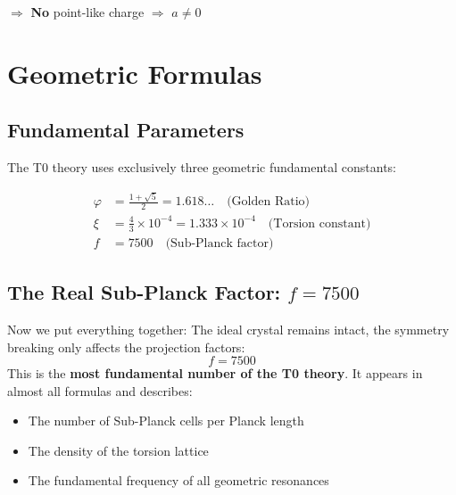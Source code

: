 	$\Rightarrow$ \textbf{No} point-like charge $\Rightarrow$ $a \neq 0$
	
	\section{Geometric Formulas}
	
	\subsection{Fundamental Parameters}
	
	The T0 theory uses exclusively three geometric fundamental constants:
	
	\begin{align}
		\varphi &= \frac{1 + \sqrt{5}}{2} = 1.618\ldots \quad \text{(Golden Ratio)} \\
		\xi &= \frac{4}{3} \times 10^{-4} = 1.333 \times 10^{-4} \quad \text{(Torsion constant)} \\
		f &= 7500 \quad \text{(Sub-Planck factor)}
	\end{align}
	
	\subsection{The Real Sub-Planck Factor: \(f = 7500\)}
	Now we put everything together: The ideal crystal remains intact, the symmetry breaking only affects the projection factors:
	\begin{equation}
		\boxed{f = 7500}
	\end{equation}
	This is the \textbf{most fundamental number of the T0 theory}. It appears in almost all formulas and describes:
	\begin{itemize}
		\item The number of Sub-Planck cells per Planck length
		\item The density of the torsion lattice
		\item The fundamental frequency of all geometric resonances
	\end{itemize}
